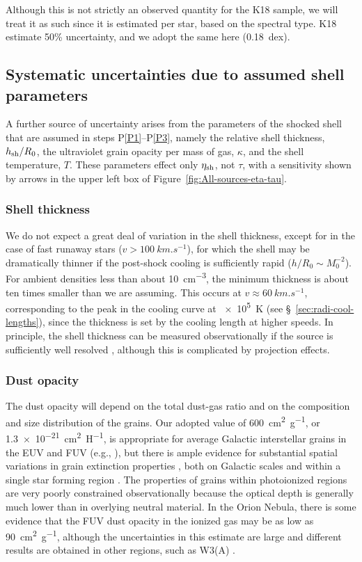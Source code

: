 Although this is not strictly an observed quantity for the K18 sample,
we will treat it as such since it is estimated per star, based on the
spectral type.  K18 estimate 50\% uncertainty, and we adopt the same
here (0.18~dex).


\subsection{Systematic uncertainties due to assumed shell parameters}
\label{sec:syst-uncert-due}

A further source of uncertainty arises from the parameters of the
shocked shell that are assumed in steps P\ref{P1}--P\ref{P3}, namely
the relative shell thickness, \(h_{\text{sh}}/R_0\), the ultraviolet grain
opacity per mass of gas, \(\kappa\), and the shell temperature, \(T\).
These parameters effect only \(\eta_{\text{sh}}\), not \(\tau\), with a
sensitivity shown by arrows in the upper left box of
Figure~\ref{fig:All-sources-eta-tau}.

\subsubsection{Shell thickness}
\label{sec:shell-thickness}
We do not expect a great deal of variation in the shell thickness,
except for in the case of fast runaway stars
(\(v > \SI{100}{km.s^{-1}}\)), for which the shell may be dramatically
thinner if the post-shock cooling is sufficiently rapid
(\(h / R_0 \sim M_0^{-2}\)).  For ambient densities less than about
\SI{10}{cm^{-3}}, the minimum thickness is about ten times smaller
than we are assuming.  This occurs at
\(v \approx \SI{60}{km.s^{-1}}\), corresponding to the peak in the
cooling curve at \SI{e5}{K} (see \S~\ref{sec:radi-cool-lengths}),
since the thickness is set by the cooling length at higher speeds.  In
principle, the shell thickness can be measured observationally if the
source is sufficiently well resolved \citep{Kobulnicky:2017a},
although this is complicated by projection effects.

\subsubsection{Dust opacity}
\label{sec:dust-opacity}
The dust opacity will depend on the total dust-gas ratio and on the
composition and size distribution of the grains.  Our adopted value of
\SI{600}{cm^2.g^{-1}}, or \SI{1.3e-21}{cm^2.H^{-1}}, is appropriate
for average Galactic interstellar grains in the EUV and FUV (e.g.,
\citealp{Weingartner:2001a}), but there is ample evidence for
substantial spatial variations in grain extinction properties
\citep{Fitzpatrick:2007a}, both on Galactic scales
\citep{Schlafly:2016a} and within a single star forming region
\citep{Beitia-Antero:2017a}.  The properties of grains within
photoionized regions are very poorly constrained observationally
because the optical depth is generally much lower than in overlying
neutral material.  In the Orion Nebula, there is some evidence
\citep{Salgado:2016a} that the FUV dust opacity in the ionized gas may
be as low as \SI{90}{cm^2.g^{-1}}, although the uncertainties in this
estimate are large and different results are obtained in other
regions, such as W3(A) \citep{Salgado:2012a}.   


